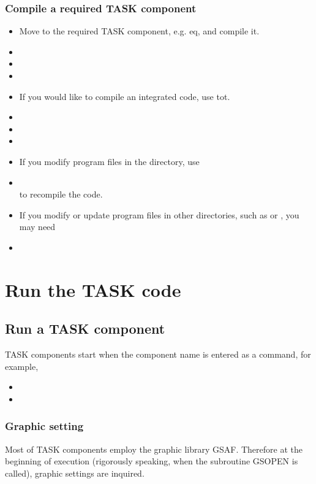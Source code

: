 \documentclass[11pt]{article}
\begin{document}
\subsubsection{Compile a required TASK component}

\begin{itemize}
\item
Move to the required TASK component, e.g. eq, and compile it.
\item[\qquad]
\item[\qquad]
\item[\qquad]
\item
If you would like to compile an integrated code, use tot.
\item[\qquad]
\item[\qquad]
\item[\qquad]
\item
If you modify program files in the directory, use
\item[\qquad]
\\
to recompile the code.
\item
If you modify or update program files in other directories, such as
 or , you may need 
\item[\qquad]
\end{itemize}

\section{Run the TASK code}

\subsection{Run a TASK component}

TASK components start when the component name is entered as a
command, for example, 
\begin{itemize}
\item[\qquad]
\item[\qquad]
\end{itemize}

\subsubsection{Graphic setting}

Most of TASK components employ the graphic library GSAF.  Therefore at
the beginning of execution (rigorously speaking, when the subroutine
GSOPEN is called), graphic settings are inquired. 
\end{document}
